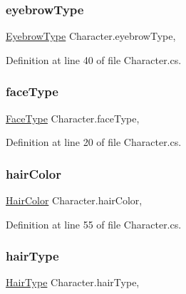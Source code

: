 \subsubsection{\texorpdfstring{eyebrowType}{eyebrowType}}
{\footnotesize\ttfamily \mbox{\hyperlink{class_character_a7ba51a2ab6ee02a615df9275665c5e4c}{Eyebrow\+Type}} Character.\+eyebrow\+Type\hspace{0.3cm}{\ttfamily [get]}, {\ttfamily [set]}}



Definition at line 40 of file Character.\+cs.

\mbox{\label{class_character_ab7552f9cfc719cb2b86820ac9381764b}} 
\subsubsection{\texorpdfstring{faceType}{faceType}}
{\footnotesize\ttfamily \mbox{\hyperlink{class_character_aae9a74ea017a528536789f545094d628}{Face\+Type}} Character.\+face\+Type\hspace{0.3cm}{\ttfamily [get]}, {\ttfamily [set]}}



Definition at line 20 of file Character.\+cs.

\mbox{\label{class_character_a5814d461d5a35e4784864f4287d0d458}} 
\subsubsection{\texorpdfstring{hairColor}{hairColor}}
{\footnotesize\ttfamily \mbox{\hyperlink{class_character_a7940fffce9bfadb9e7abf15490cf8bb0}{Hair\+Color}} Character.\+hair\+Color\hspace{0.3cm}{\ttfamily [get]}, {\ttfamily [set]}}



Definition at line 55 of file Character.\+cs.

\mbox{\label{class_character_add6905ded7f0e4c0573038bd488b3cea}} 
\subsubsection{\texorpdfstring{hairType}{hairType}}
{\footnotesize\ttfamily \mbox{\hyperlink{class_character_ada39ccb0e0be37a8f8f0e9a864eb5733}{Hair\+Type}} Character.\+hair\+Type\hspace{0.3cm}{\ttfamily [get]}, {\ttfamily [set]}}



